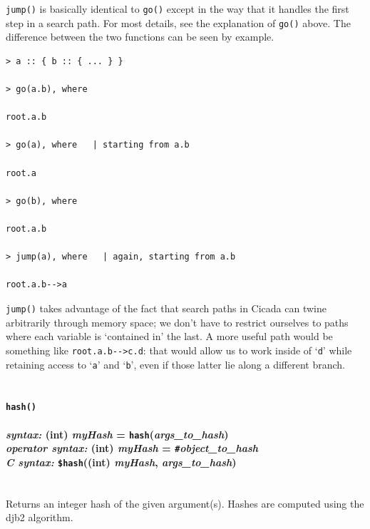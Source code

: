 \documentclass{article}
\newenvironment{code}{
       \begin{list}{}{
               \setlength{\leftmargin}{.4in}
               \setlength{\rightmargin}{0in}
               \setlength{\topsep}{.2in}
       }
       \small
       \item[] }
       { \end{list}   }
\begin{document}
\verb#jump()# is basically identical to \verb#go()# except in the way that it handles the first step in a search path.   For most details, see the explanation of \verb#go()# above.  The difference between the two functions can be seen by example.

\begin{code} \begin{verbatim}
> a :: { b :: { ... } }

> go(a.b), where

root.a.b

> go(a), where   | starting from a.b

root.a

> go(b), where

root.a.b

> jump(a), where   | again, starting from a.b

root.a.b-->a
\end{verbatim} \end{code}

\noindent \verb#jump()# takes advantage of the fact that search paths in Cicada can twine arbitrarily through memory space; we don't have to restrict ourselves to paths where each variable is `contained in' the last.  A more useful path would be something like \verb#root.a.b-->c.d#:  that would allow us to work inside of `\verb#d#' while retaining access to `\verb#a#' and `\verb#b#', even if those latter lie along a different branch.\\\\





\paragraph{\texttt{hash()}\\\\
\normalfont \emph{syntax: } (int) \emph{myHash} = \texttt{hash}(\emph{args\_to\_hash})\\
\normalfont \emph{operator syntax: } (int) \emph{myHash} = \texttt{\#}\emph{object\_to\_hash}\\
\normalfont \emph{C syntax: } \texttt{\$hash}((int) \emph{myHash}, \emph{args\_to\_hash})\\\\}

Returns an integer hash of the given argument(s).  Hashes are computed using the djb2 algorithm.\\
\end{document}
